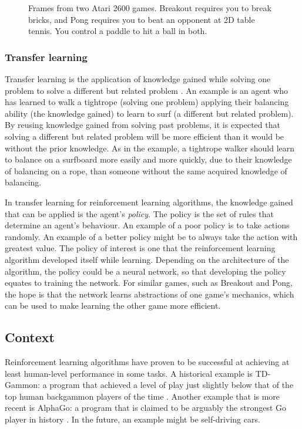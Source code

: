 \documentclass[12pt,a4paper]{article}
\begin{document}
\begin{figure}[!tbp]
    \centering
    \hfill
    \caption{Frames from two Atari 2600 games. Breakout requires you to break bricks, and Pong requires you to beat an opponent at 2D table tennis. You control a paddle to hit a ball in both.}
\end{figure}

\subsubsection{Transfer learning}
Transfer learning is the application of knowledge gained while solving one problem to solve a different but related problem \cite{2010}. An example is an agent who has learned to walk a tightrope (solving one problem) applying their balancing ability (the knowledge gained) to learn to surf (a different but related problem). By reusing knowledge gained from solving past problems, it is expected that solving a different but related problem will be more efficient than it would be without the prior knowledge. As in the example, a tightrope walker should learn to balance on a surfboard more easily and more quickly, due to their knowledge of balancing on a rope, than someone without the same acquired knowledge of balancing. 

In transfer learning for reinforcement learning algorithms, the knowledge gained that can be applied is the agent's \emph{policy}. The policy is the set of rules that determine an agent's behaviour. An example of a poor policy is to take actions randomly. An example of a better policy might be to always take the action with greatest value. The policy of interest is one that the reinforcement learning algorithm developed itself while learning. Depending on the architecture of the algorithm, the policy could be a neural network, so that developing the policy equates to training the network. For similar games, such as Breakout and Pong, the hope is that the network learns abstractions of one game's mechanics, which can be used to make learning the other game more efficient.

\subsection{Context}
Reinforcement learning algorithms have proven to be successful at achieving at least human-level performance in some tasks. A historical example is TD-Gammon: a program that achieved a level of play just slightly below that of the top human backgammon players of the time \cite{}. Another example that is more recent is AlphaGo: a program that is claimed to be arguably the strongest Go player in history \cite{}. In the future, an example might be self-driving cars.
\end{document}
